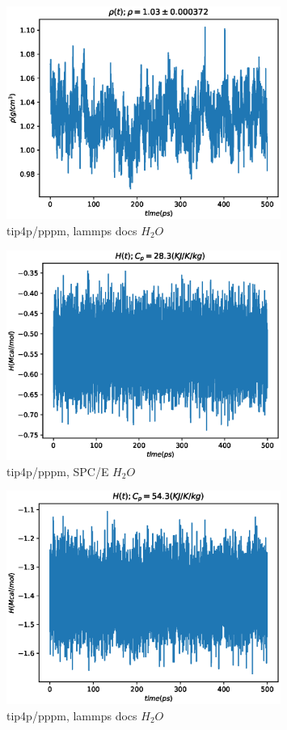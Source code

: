 \documentclass[a4paper,12pt]{article} %
\begin{document}
\begin{figure}[h!]
\begin{center}
\includegraphics[width=0.8\textwidth]{./pics/tip4prho}
\end{center}
\caption{tip4p/pppm, lammps docs $H_2 O$} \label{img:pppm_H_N5}
\end{figure}

\newpage

\begin{figure}[h!]
\begin{center}
\includegraphics[width=0.8\textwidth]{./pics/stdH}
\end{center}
\caption{tip4p/pppm, SPC/E $H_2 O$} \label{img:pppm_H_N5}
\end{figure}

\begin{figure}[h!]
\begin{center}
\includegraphics[width=0.8\textwidth]{./pics/tip4pH}
\end{center}
\caption{tip4p/pppm, lammps docs $H_2 O$} \label{img:pppm_H_N5}
\end{figure}
\end{document}
